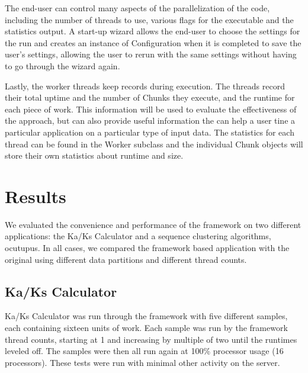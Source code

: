 \documentclass[12pt]{article}
\begin{document}
The end-user can control many aspects of the parallelization of the code,
including the number of threads to use, various flags for the executable and the
statistics output.  A start-up wizard allows the end-user to choose the settings
for the run and creates an instance of Configuration when it is completed to
save the user's settings, allowing the user to rerun with the same settings
without having to go through the wizard again.

Lastly, the worker threads keep records during execution. The threads record
their total uptime and the number of Chunks they execute, and the runtime for
each piece of work. This information will be used to evaluate the effectiveness
of the approach, but can also provide useful information the can help a user
tine a particular application on a particular type of input data. The statistics
for each thread can be found in the Worker subclass and the individual Chunk
objects will store their own statistics about runtime and size.

\section{Results}

We evaluated the convenience and performance of the framework on two different
applications: the Ka/Ks Calculator and a sequence clustering algorithms,
ocutupus. In all cases, we compared the framework based application with the
original using different data partitions and different thread counts.

\subsection{Ka/Ks Calculator}
Ka/Ks Calculator was run through the framework with five different samples, each
containing sixteen units of work. Each sample was run by the framework thread
counts, starting at 1 and increasing by multiple of two until the runtimes
leveled off. The samples were then all run again at 100\% processor usage (16
processors). These tests were run with minimal other activity on the server.
\end{document}
